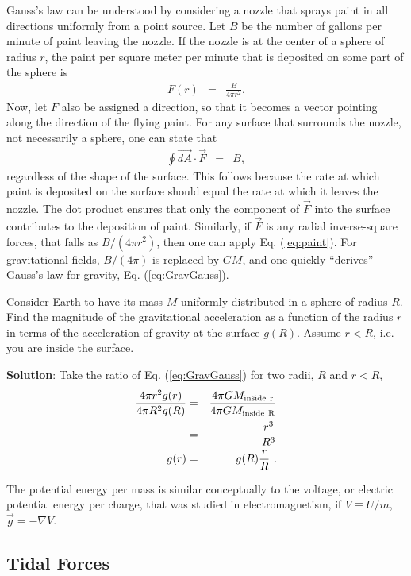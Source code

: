 Gauss's law can be understood by considering a nozzle that sprays paint in all directions uniformly from a point source. Let $B$ be the number of gallons per minute of paint leaving the nozzle. If the nozzle is at the center of a sphere of radius $r$, the paint per square meter per minute that is deposited on some part of the sphere is 
\begin{eqnarray}
F(r)&=&\frac{B}{4\pi r^2}.
\end{eqnarray}
Now, let $F$ also be assigned a direction, so that it becomes a vector pointing along the direction of the flying paint. For any surface that surrounds the nozzle, not necessarily a sphere, one can state that
\begin{eqnarray}
\label{eq:paint}
\oint \vec{dA}\cdot\vec{F}&=&B,
\end{eqnarray}
regardless of the shape of the surface. This follows because the rate at which paint is deposited on the surface should equal the rate at which it leaves the nozzle. The dot product ensures that only the component of $\vec{F}$ into the surface contributes to the deposition of paint. Similarly, if $\vec{F}$ is any radial inverse-square forces, that falls as $B/(4\pi r^2)$, then one can apply Eq. (\ref{eq:paint}). For gravitational fields, $B/(4\pi)$ is replaced by $GM$, and one quickly ``derives'' Gauss's law for gravity, Eq. (\ref{eq:GravGauss}).

\example
Consider Earth to have its mass $M$ uniformly distributed in a sphere of radius $R$. Find the magnitude of the gravitational acceleration as a function of the radius $r$ in terms of the acceleration of gravity at the surface $g(R)$. Assume $r<R$, i.e. you are inside the surface.

{\bf Solution}: Take the ratio of Eq. (\ref{eq:GravGauss}) for two radii, $R$ and $r<R$,
\begin{eqnarray*}
\frac{4\pi r^2 g(r)}{4\pi R^2 g(R)}&=&\frac{4\pi GM_{\rm inside~r}}{4\pi GM_{\rm inside~R}}\\
\nonumber
&=&\frac{r^3}{R^3}\\
\nonumber
g(r)&=&g(R)\frac{r}{R}~.
\end{eqnarray*}

The potential energy per mass is similar conceptually to the voltage, or electric potential energy per charge, that was studied in electromagnetism, if $V\equiv U/m$, $\vec{g}=-\nabla V$.

\exampleend

\subsection{Tidal Forces}

